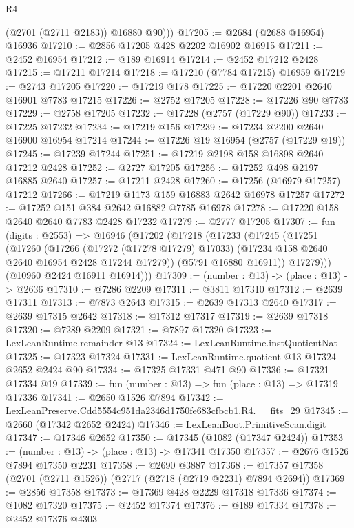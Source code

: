 \begin{lexlean}{R4}
\begin{coremodule}
          (@2701 (@2711 @2183))
          @16880
          @90)))
@17205 := @2684 (@2688 @16954) @16936
@17210 := @2856 @17205 @428 @2202 @16902 @16915
@17211 := @2452 @16954
@17212 := @189 @16914
@17214 := @2452 @17212 @2428
@17215 := @17211 @17214
@17218 := @17210 (@7784 @17215) @16959
@17219 := @2743 @17205
@17220 := @17219 @178
@17225 := @17220 @2201 @2640 @16901 @7783 @17215
@17226 := @2752 @17205
@17228 := @17226 @90 @7783
@17229 := @2758 @17205
@17232 := @17228 (@2757 (@17229 @90))
@17233 := @17225 @17232
@17234 := @17219 @156
@17239 := @17234 @2200 @2640 @16900 @16954 @17214
@17244 := @17226 @19 @16954 (@2757 (@17229 @19))
@17245 := @17239 @17244
@17251 := @17219 @2198 @158 @16898 @2640 @17212 @2428
@17252 := @2727 @17205
@17256 := @17252 @498 @2197 @16885 @2640
@17257 := @17211 @2428
@17260 := @17256 (@16979 @17257) @17212
@17266 := @17219 @1173 @159 @16883 @2642 @16978 @17257
@17272 := @17252 @151 @384 @2642 @16882 @7785 @16978
@17278 := @17220 @158 @2640 @2640 @7783 @2428 @17232
@17279 := @2777 @17205
@17307 := fun (digits : @2553) =>
  @16946
    (@17202
      (@17218
        (@17233
          (@17245
            (@17251
              (@17260
                (@17266
                  (@17272 (@17278 @17279) @17033)
                  (@17234 @158 @2640 @2640 @16954 @2428 @17244 @17279))
                (@5791 @16880 @16911))
              @17279)))
        (@10960 @2424 @16911 @16914)))
@17309 := (number : @13) -> (place : @13) -> @2636
@17310 := @7286 @2209
@17311 := @3811 @17310
@17312 := @2639 @17311
@17313 := @7873 @2643
@17315 := @2639 @17313 @2640
@17317 := @2639 @17315 @2642
@17318 := @17312 @17317
@17319 := @2639 @17318
@17320 := @7289 @2209
@17321 := @7897 @17320
@17323 := LexLeanRuntime.remainder @13
@17324 := LexLeanRuntime.instQuotientNat
@17325 := @17323 @17324
@17331 := LexLeanRuntime.quotient @13 @17324 @2652 @2424 @90
@17334 := @17325 @17331 @471 @90
@17336 := @17321 @17334 @19
@17339 := fun (number : @13) => fun (place : @13) => @17319 @17336
@17341 := @2650 @1526 @7894
@17342 := LexLeanPreserve.Cdd5554c951da2346d1750fe683cfbcb1.R4.__fits_29
@17345 := @2660 (@17342 @2652 @2424)
@17346 := LexLeanBoot.PrimitiveScan.digit
@17347 := @17346 @2652
@17350 := @17345 (@1082 (@17347 @2424))
@17353 := (number : @13) -> (place : @13) -> @17341 @17350
@17357 := @2676 @1526 @7894 @17350 @2231
@17358 := @2690 @3887
@17368 := @17357 @17358 (@2701 (@2711 @1526)) (@2717 (@2718 (@2719 @2231) @7894 @2694))
@17369 := @2856 @17358
@17373 := @17369 @428 @2229 @17318 @17336
@17374 := @1082 @17320
@17375 := @2452 @17374
@17376 := @189 @17334
@17378 := @2452 @17376 @4303

\end{coremodule}
\end{lexlean}
